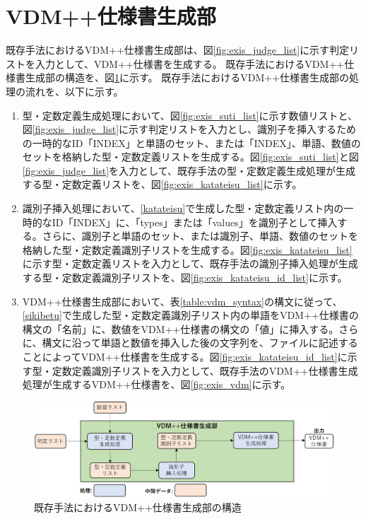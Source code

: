 \section{VDM++仕様書生成部}
既存手法におけるVDM++仕様書生成部は、図\ref{fig:exis_judge_list}に示す判定リストを入力として、VDM++仕様書を生成する。
既存手法におけるVDM++仕様書生成部の構造を、図\ref{fig:exis_generator_structure}に示す。
既存手法におけるVDM++仕様書生成部の処理の流れを、以下に示す。

\begin{enumerate}
    \item 型・定数定義生成処理において、図\ref{fig:exis_suti_list}に示す数値リストと、図\ref{fig:exis_judge_list}に示す判定リストを入力とし、識別子を挿入するための一時的なID「INDEX」と単語のセット、または「INDEX」、単語、数値のセットを格納した型・定数定義リストを生成する。図\ref{fig:exis_suti_list}と図\ref{fig:exis_judge_list}を入力として、既存手法の型・定数定義生成処理が生成する型・定数定義リストを、図\ref{fig:exis_katateisu_list}に示す。
    \label{katateisu}
    \item 識別子挿入処理において、\ref{katateisu}で生成した型・定数定義リスト内の一時的なID「INDEX」に、「types」または「values」を識別子として挿入する。さらに、識別子と単語のセット、または識別子、単語、数値のセットを格納した型・定数定義識別子リストを生成する。図\ref{fig:exis_katateisu_list}に示す型・定数定義リストを入力として、既存手法の識別子挿入処理が生成する型・定数定義識別子リストを、図\ref{fig:exis_katateisu_id_list}に示す。
    \label{sikibetu}
    \item VDM++仕様書生成部において、表\ref{table:vdm_syntax}の構文に従って、\ref{sikibetu}で生成した型・定数定義識別子リスト内の単語をVDM++仕様書の構文の「名前」に、数値をVDM++仕様書の構文の「値」に挿入する。さらに、構文に沿って単語と数値を挿入した後の文字列を、ファイルに記述することによってVDM++仕様書を生成する。図\ref{fig:exis_katateisu_id_list}に示す型・定数定義識別子リストを入力として、既存手法のVDM++仕様書生成処理が生成するVDM++仕様書を、図\ref{fig:exis_vdm}に示す。
\end{enumerate}

\begin{figure}[tp]
    \begin{center}
        \includegraphics[width=1.0\columnwidth]{image/exis_generator_structure.png}
        \caption{既存手法におけるVDM++仕様書生成部の構造}
        \label{fig:exis_generator_structure}
    \end{center}
\end{figure}

